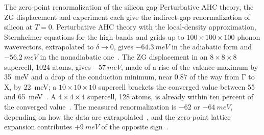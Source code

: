 \begin{workedexample}{The zero-point renormalization of the silicon gap}\label{we:E-zpr}
Perturbative AHC theory, the ZG displacement and experiment each give the indirect-gap renormalization of silicon at $T = 0$. Perturbative AHC theory with the local-density approximation, Sternheimer equations for the high bands and grids up to $100\times100\times100$ phonon wavevectors, extrapolated to $\delta \to 0$, gives $-\SI{64.3}{meV}$ in the adiabatic form and $-\SI{56.2}{meV}$ in the nonadiabatic one~\cite[Table~VI]{ponce2015temperature}. The ZG displacement in an $8\times8\times8$ supercell, 1024 atoms, gives $-\SI{57}{meV}$, made of a rise of the valence maximum by \SI{35}{meV} and a drop of the conduction minimum, near $0.87$ of the way from $\mathrm{\Gamma}$ to $\mathrm{X}$, by \SI{22}{meV}; a $10\times10\times10$ supercell brackets the converged value between 55 and \SI{65}{meV}~\cite[Sect.~VII\,B]{zacharias2020theory}. A $4\times4\times4$ supercell, 128 atoms, is already within ten percent of the converged value~\cite[Sect.~VII]{zacharias2020theory}. The measured renormalization is $-62$ or $-\SI{64}{meV}$, depending on how the data are extrapolated~\cite[Table~VI]{ponce2015temperature}, and the zero-point lattice expansion contributes $+\SI{9}{meV}$ of the opposite sign~\cite[Table~S2]{miglio2020predominance}.


\end{workedexample}
